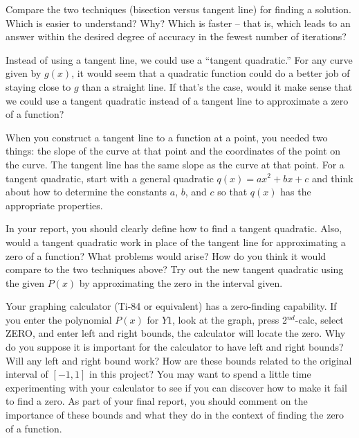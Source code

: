 \documentclass
[justified,nohyper]
{tufte-handout}
\theoremstyle{mydef}
\begin{document}
Compare the two techniques (bisection versus tangent line) for finding a solution. Which is easier to understand? Why? Which is faster -- that is, which leads to an answer within the desired degree of accuracy in the fewest number of iterations?

Instead of using a tangent line, we could use a ``tangent quadratic.'' For any curve given by $g(x)$, it would seem that a quadratic function could do a better job of staying close to $g$ than a straight line. If that's the case, would it make sense that we could use a tangent quadratic instead of a tangent line to approximate a zero of a function?

When you construct a tangent line to a function at a point, you needed two things: the slope of the curve at that point and the coordinates of the point on the curve. The tangent line has the same slope as the curve at that point. For a tangent quadratic, start with a general quadratic $q(x)=ax^2+bx+c$ and think about how to determine the constants $a$, $b$, and $c$ so that $q(x)$ has the appropriate properties.

In your report, you should clearly define how to find a tangent quadratic. Also, would a tangent quadratic work in place of the tangent line for approximating a zero of a function? What problems would arise? How do you think it would compare to the two techniques above? Try out the new tangent quadratic using the given $P(x)$ by approximating the zero in the interval given.

Your graphing calculator (Ti-84 or equivalent) has a zero-finding capability. If you enter the polynomial $P(x)$ for $Y1$, look at the graph, press 2$^{nd}$-calc, select ZERO, and enter left and right bounds, the calculator will locate the zero. Why do you suppose it is important for the calculator to have left and right bounds? Will any left and right bound work? How are these bounds related to the original interval of $[-1,1]$ in this project? You may want to spend a little time experimenting with your calculator to see if you can discover how to make it fail to find a zero. As part of your final report, you should comment on the importance of these bounds and what they do in the context of finding the zero of a function.
\end{document}
